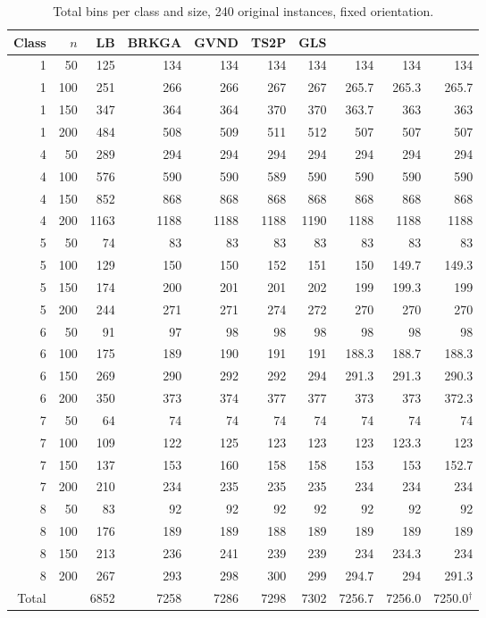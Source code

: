 \begin{table}[htbp]
\centering
\small\setlength{\tabcolsep}{4pt}
\caption{Total bins per class and size, 240 original instances, fixed orientation.}
\label{tab:e-cells}
\begin{tabular}{@{}rrrrrrrrrr@{}}
\toprule
Class & $n$ & LB & BRKGA & GVND & TS2P & GLS & \cfgfast{} & \cfgbal{} & \cfgqual{}\\
\midrule
1 & 50 & 125 & 134 & 134 & 134 & 134 & 134 & 134 & 134 \\
1 & 100 & 251 & 266 & 266 & 267 & 267 & 265.7 & 265.3 & 265.7 \\
1 & 150 & 347 & 364 & 364 & 370 & 370 & 363.7 & 363 & 363 \\
1 & 200 & 484 & 508 & 509 & 511 & 512 & 507 & 507 & 507 \\
4 & 50 & 289 & 294 & 294 & 294 & 294 & 294 & 294 & 294 \\
4 & 100 & 576 & 590 & 590 & 589 & 590 & 590 & 590 & 590 \\
4 & 150 & 852 & 868 & 868 & 868 & 868 & 868 & 868 & 868 \\
4 & 200 & 1163 & 1188 & 1188 & 1188 & 1190 & 1188 & 1188 & 1188 \\
5 & 50 & 74 & 83 & 83 & 83 & 83 & 83 & 83 & 83 \\
5 & 100 & 129 & 150 & 150 & 152 & 151 & 150 & 149.7 & 149.3 \\
5 & 150 & 174 & 200 & 201 & 201 & 202 & 199 & 199.3 & 199 \\
5 & 200 & 244 & 271 & 271 & 274 & 272 & 270 & 270 & 270 \\
6 & 50 & 91 & 97 & 98 & 98 & 98 & 98 & 98 & 98 \\
6 & 100 & 175 & 189 & 190 & 191 & 191 & 188.3 & 188.7 & 188.3 \\
6 & 150 & 269 & 290 & 292 & 292 & 294 & 291.3 & 291.3 & 290.3 \\
6 & 200 & 350 & 373 & 374 & 377 & 377 & 373 & 373 & 372.3 \\
7 & 50 & 64 & 74 & 74 & 74 & 74 & 74 & 74 & 74 \\
7 & 100 & 109 & 122 & 125 & 123 & 123 & 123 & 123.3 & 123 \\
7 & 150 & 137 & 153 & 160 & 158 & 158 & 153 & 153 & 152.7 \\
7 & 200 & 210 & 234 & 235 & 235 & 235 & 234 & 234 & 234 \\
8 & 50 & 83 & 92 & 92 & 92 & 92 & 92 & 92 & 92 \\
8 & 100 & 176 & 189 & 189 & 188 & 189 & 189 & 189 & 189 \\
8 & 150 & 213 & 236 & 241 & 239 & 239 & 234 & 234.3 & 234 \\
8 & 200 & 267 & 293 & 298 & 300 & 299 & 294.7 & 294 & 291.3 \\
\midrule
Total & & 6852 & 7258 & 7286 & 7298 & 7302 & 7256.7 & 7256.0 & 7250.0$^\dagger$\\
\bottomrule
\end{tabular}
\end{table}
